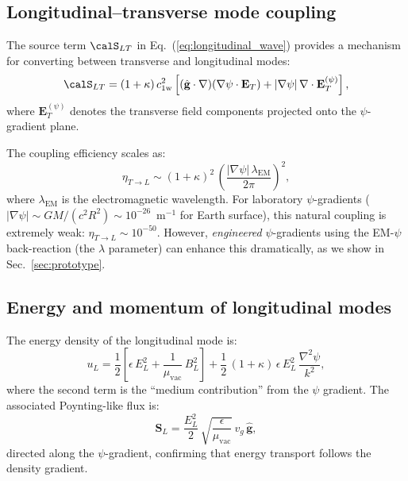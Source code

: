 \documentclass[aps,prd,twocolumn,superscriptaddress,nofootinbib,floatfix]{revtex4-2}
\newcommand{\psifield}{\psi}
\newcommand{\cfield}{c_{\text{1w}}}
\newcommand{\Evec}{\mathbf{E}}
\newcommand{\Svec}{\mathbf{S}}
\begin{document}
\subsection{Longitudinal--transverse mode coupling}

The source term $\calS_{LT}$ in Eq.~(\ref{eq:longitudinal_wave})
provides a mechanism for converting between transverse and
longitudinal modes:
\begin{equation}
\calS_{LT} = (1+\kappa)\,\cfield^2\left[
(\hat{\mathbf{g}}\cdot\nabla)(\nabla\psifield\cdot\Evec_T)
+ |\nabla\psifield|\,\nabla\cdot\Evec_T^{(\psi)}
\right],
\label{eq:mode_coupling}
\end{equation}
where $\Evec_T^{(\psi)}$ denotes the transverse field components
projected onto the $\psifield$-gradient plane.

The coupling efficiency scales as:
\begin{equation}
\eta_{T\to L} \sim (1+\kappa)^2\,
\left(\frac{|\nabla\psifield|\,\lambda_{\text{EM}}}{2\pi}\right)^2,
\label{eq:coupling_efficiency}
\end{equation}
where $\lambda_{\text{EM}}$ is the electromagnetic wavelength.
For laboratory $\psifield$-gradients
($|\nabla\psifield| \sim GM/(c^2 R^2) \sim 10^{-26}$~m$^{-1}$
for Earth surface), this natural coupling is extremely weak:
$\eta_{T\to L} \sim 10^{-50}$. However, \emph{engineered}
$\psifield$-gradients using the EM-$\psifield$ back-reaction
(the $\lambda$ parameter) can enhance this dramatically, as we
show in Sec.~\ref{sec:prototype}.

\subsection{Energy and momentum of longitudinal modes}

The energy density of the longitudinal mode is:
\begin{equation}
u_L = \frac{1}{2}\left[\epsilon\,E_L^2
+ \frac{1}{\mu_{\text{vac}}}\,B_L^2\right]
+ \frac{1}{2}\,(1+\kappa)\,\epsilon\,E_L^2\,
\frac{\nabla^2\psifield}{k^2},
\label{eq:energy_density_L}
\end{equation}
where the second term is the ``medium contribution'' from the
$\psifield$ gradient. The associated Poynting-like flux is:
\begin{equation}
\Svec_L = \frac{E_L^2}{2}\,\sqrt{\frac{\epsilon}{\mu_{\text{vac}}}}
\,v_g\,\hat{\mathbf{g}},
\label{eq:poynting_L}
\end{equation}
directed along the $\psifield$-gradient, confirming that energy
transport follows the density gradient.
\end{document}
